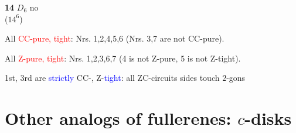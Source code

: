 \documentclass{beamer}
\begin{document}
\begin{frame}
\begin{center}
\begin{minipage}[b]{25mm}
{\bf 14} $D_{6}$  no\\($14^6$)
\end{minipage}\end{center}
All \textcolor{red}{CC-pure, tight}: Nrs. 1,2,4,5,6 (Nrs. 3,7 are not CC-pure).

 All \textcolor{red}{Z-pure, tight}: Nrs. 1,2,3,6,7 (4 is not Z-pure, 5 is not Z-tight).

1st, 3rd are \textcolor{blue}{strictly} CC-, Z-\textcolor{blue}{tight}:
all ZC-circuits sides touch
$2$-gons
\end{frame}




\section[]{Other analogs of fullerenes: $c$-disks}

\end{document}
